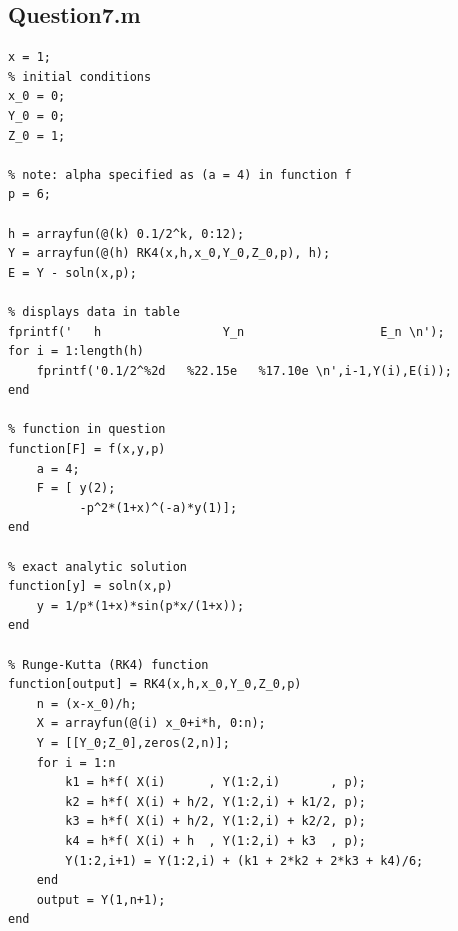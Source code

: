 \documentclass[a4paper]{article}
\begin{document}
\pagebreak
\subsection*{Question\textunderscore7.m}
\begin{lstlisting}[style = Matlab-editor]
% value to be calculated
x = 1;
% initial conditions
x_0 = 0;
Y_0 = 0;
Z_0 = 1;

% note: alpha specified as (a = 4) in function f
p = 6;

h = arrayfun(@(k) 0.1/2^k, 0:12);
Y = arrayfun(@(h) RK4(x,h,x_0,Y_0,Z_0,p), h);
E = Y - soln(x,p);

% displays data in table
fprintf('   h                 Y_n                   E_n \n');
for i = 1:length(h)
    fprintf('0.1/2^%2d   %22.15e   %17.10e \n',i-1,Y(i),E(i));
end

% function in question
function[F] = f(x,y,p)
    a = 4;
    F = [ y(2);
          -p^2*(1+x)^(-a)*y(1)];
end

% exact analytic solution
function[y] = soln(x,p)
    y = 1/p*(1+x)*sin(p*x/(1+x));
end

% Runge-Kutta (RK4) function
function[output] = RK4(x,h,x_0,Y_0,Z_0,p)
    n = (x-x_0)/h;
    X = arrayfun(@(i) x_0+i*h, 0:n);
    Y = [[Y_0;Z_0],zeros(2,n)];
    for i = 1:n
        k1 = h*f( X(i)      , Y(1:2,i)       , p);
        k2 = h*f( X(i) + h/2, Y(1:2,i) + k1/2, p);
        k3 = h*f( X(i) + h/2, Y(1:2,i) + k2/2, p);
        k4 = h*f( X(i) + h  , Y(1:2,i) + k3  , p);
        Y(1:2,i+1) = Y(1:2,i) + (k1 + 2*k2 + 2*k3 + k4)/6;
    end
    output = Y(1,n+1);
end
\end{lstlisting}

\pagebreak
\end{document}

